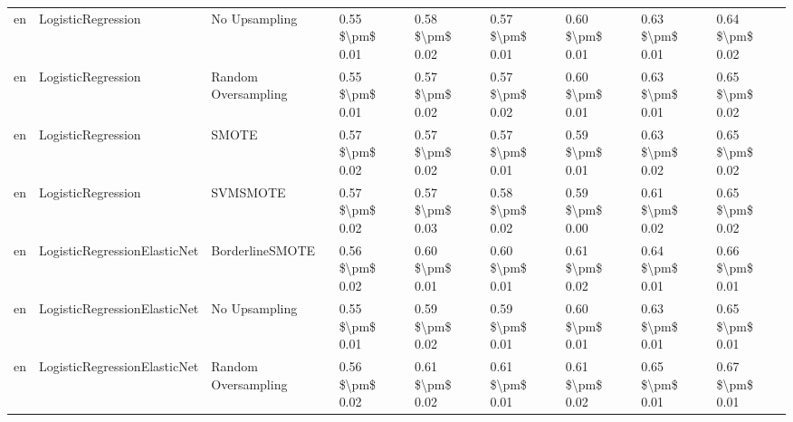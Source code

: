 \begin{tabular}{lllllllll}
      en &              LogisticRegression &                 No Upsampling &     0.55 \$\textbackslash pm\$ 0.01 &           0.58 \$\textbackslash pm\$ 0.02 &       0.57 \$\textbackslash pm\$ 0.01 &        0.60 \$\textbackslash pm\$ 0.01 &                         0.63 \$\textbackslash pm\$ 0.01 &     0.64 \$\textbackslash pm\$ 0.02 \\
      en &              LogisticRegression &           Random Oversampling &     0.55 \$\textbackslash pm\$ 0.01 &           0.57 \$\textbackslash pm\$ 0.02 &       0.57 \$\textbackslash pm\$ 0.02 &        0.60 \$\textbackslash pm\$ 0.01 &                         0.63 \$\textbackslash pm\$ 0.01 &     0.65 \$\textbackslash pm\$ 0.02 \\
      en &              LogisticRegression &                         SMOTE &     0.57 \$\textbackslash pm\$ 0.02 &           0.57 \$\textbackslash pm\$ 0.02 &       0.57 \$\textbackslash pm\$ 0.01 &        0.59 \$\textbackslash pm\$ 0.01 &                         0.63 \$\textbackslash pm\$ 0.02 &     0.65 \$\textbackslash pm\$ 0.02 \\
      en &              LogisticRegression &                      SVMSMOTE &     0.57 \$\textbackslash pm\$ 0.02 &           0.57 \$\textbackslash pm\$ 0.03 &       0.58 \$\textbackslash pm\$ 0.02 &        0.59 \$\textbackslash pm\$ 0.00 &                         0.61 \$\textbackslash pm\$ 0.02 &     0.65 \$\textbackslash pm\$ 0.02 \\
      en &    LogisticRegressionElasticNet &               BorderlineSMOTE &     0.56 \$\textbackslash pm\$ 0.02 &           0.60 \$\textbackslash pm\$ 0.01 &       0.60 \$\textbackslash pm\$ 0.01 &        0.61 \$\textbackslash pm\$ 0.02 &                         0.64 \$\textbackslash pm\$ 0.01 &     0.66 \$\textbackslash pm\$ 0.01 \\
      en &    LogisticRegressionElasticNet &                 No Upsampling &     0.55 \$\textbackslash pm\$ 0.01 &           0.59 \$\textbackslash pm\$ 0.02 &       0.59 \$\textbackslash pm\$ 0.01 &        0.60 \$\textbackslash pm\$ 0.01 &                         0.63 \$\textbackslash pm\$ 0.01 &     0.65 \$\textbackslash pm\$ 0.01 \\
      en &    LogisticRegressionElasticNet &           Random Oversampling &     0.56 \$\textbackslash pm\$ 0.02 &           0.61 \$\textbackslash pm\$ 0.02 &       0.61 \$\textbackslash pm\$ 0.01 &        0.61 \$\textbackslash pm\$ 0.02 &                         0.65 \$\textbackslash pm\$ 0.01 &     0.67 \$\textbackslash pm\$ 0.01 \\

\end{tabular}
